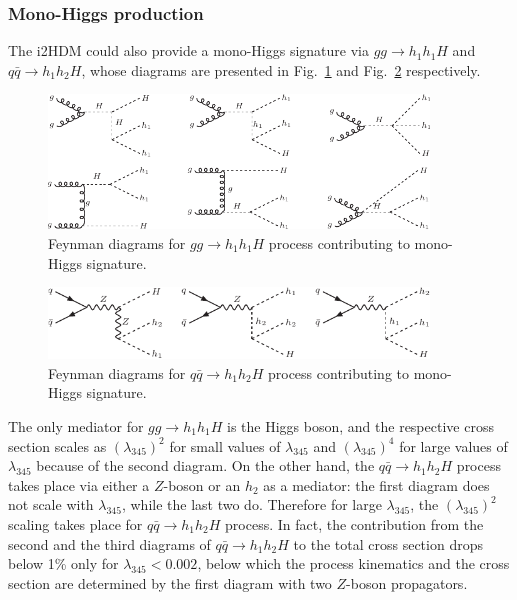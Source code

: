 \documentclass[12pt,a4paper]{article}
\begin{document}
\subsubsection{Mono-Higgs production}

The i2HDM could also provide a mono-Higgs signature
via $gg\to  h_1 h_1 H$ and $q\bar{q} \to  h_1 h_2H$,
whose diagrams are presented in Fig.~\ref{fig:fd-mono-H1}
and Fig.~\ref{fig:fd-mono-H2} respectively.
%
\begin{figure}[h!]
\begin{center}
\includegraphics[width=0.9\textwidth]{fd-mono-h1.pdf} 
\caption{Feynman diagrams for $gg\to h_1 h_1H$  process 
contributing to mono-Higgs signature.}
\label{fig:fd-mono-H1}
\end{center}
\end{figure}
\begin{figure}[h!]
\begin{center}
\includegraphics[width=0.9\textwidth]{fd-mono-h2.pdf} 
\caption{Feynman diagrams for $q\bar{q}\to h_1 h_2H$  process 
  contributing to mono-Higgs signature.}
\label{fig:fd-mono-H2}
\end{center}
\end{figure}
The only mediator for $gg\to  h_1 h_1 H$ is the Higgs boson,
and the respective cross section scales as $(\lambda_{345})^2$
for small values of $\lambda_{345}$ 
and $(\lambda_{345})^4$ for large values of $\lambda_{345}$
because of the second diagram.
On the other hand, the $q\bar{q}\to h_1 h_2H$  process 
takes place via either a $Z$-boson or an $h_2$ as a mediator:
the first diagram does not scale with $\lambda_{345}$,
while the last two do. Therefore for large $\lambda_{345}$,
the $(\lambda_{345})^2$  scaling takes place for $q\bar{q}\to h_1 h_2H$ process.
In fact,  the contribution from the second and 
the third  diagrams of  $q\bar{q}\to h_1 h_2H$
to the total cross section
drops below 1\% only for $\lambda_{345}<0.002$,
below which the process kinematics and the cross section 
are determined by the first diagram with two $Z$-boson propagators.
\end{document}

